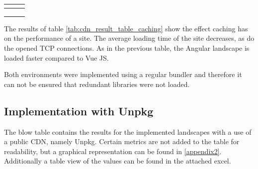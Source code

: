 \begin{longtable}[l]{*{3}{p{\mycolwidth}}}
	&  						   
	&    \\ \midrule
	
	&  						   
	&    \\ \midrule
	
	&  						   
	&    \\ \midrule
	
	&   				  
	&    \\ \bottomrule
	
\end{longtable}

The results of table \ref{tab:cdn_result_table_caching} show the effect caching has on the performance of a site. The average loading time of the site decreases, as do the opened TCP connections. As in the previous table, the Angular landscape is loaded faster compared to Vue JS.

Both environments were implemented using a regular bundler and therefore it can not be ensured that redundant libraries were not loaded.

\subsection{Implementation with Unpkg}

The blow table contains the results for the implemented landscapes with a use of a public CDN, namely Unpkg. Certain metrics are not added to the table for readability, but a graphical representation can be found in \ref{appendix2}. Additionally a table view of the values can be found in the attached excel.

